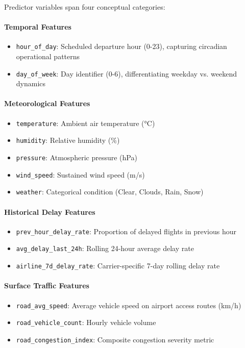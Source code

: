 \documentclass{report}
\begin{document}
Predictor variables span four conceptual categories:

\paragraph{Temporal Features}
\begin{itemize}
    \item \texttt{hour\_of\_day}: Scheduled departure hour (0-23), capturing circadian operational patterns
    \item \texttt{day\_of\_week}: Day identifier (0-6), differentiating weekday vs. weekend dynamics
\end{itemize}

\paragraph{Meteorological Features}
\begin{itemize}
    \item \texttt{temperature}: Ambient air temperature (°C)
    \item \texttt{humidity}: Relative humidity (\%)
    \item \texttt{pressure}: Atmospheric pressure (hPa)
    \item \texttt{wind\_speed}: Sustained wind speed (m/s)
    \item \texttt{weather}: Categorical condition (Clear, Clouds, Rain, Snow)
\end{itemize}

\paragraph{Historical Delay Features}
\begin{itemize}
    \item \texttt{prev\_hour\_delay\_rate}: Proportion of delayed flights in previous hour
    \item \texttt{avg\_delay\_last\_24h}: Rolling 24-hour average delay rate
    \item \texttt{airline\_7d\_delay\_rate}: Carrier-specific 7-day rolling delay rate
\end{itemize}

\paragraph{Surface Traffic Features}
\begin{itemize}
    \item \texttt{road\_avg\_speed}: Average vehicle speed on airport access routes (km/h)
    \item \texttt{road\_vehicle\_count}: Hourly vehicle volume
    \item \texttt{road\_congestion\_index}: Composite congestion severity metric
\end{itemize}
\end{document}

